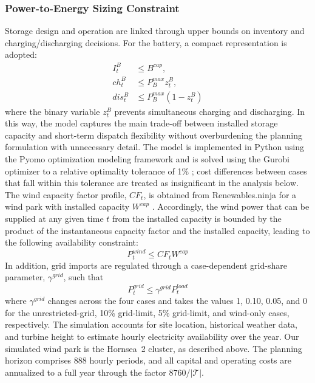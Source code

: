 \documentclass[letterpaper]{article}
\begin{document}
\subsubsection{Power-to-Energy Sizing Constraint}
Storage design and operation are linked through upper bounds on
inventory and charging/discharging decisions. For the battery, a
compact representation is adopted:
\begin{equation}
\begin{aligned}
I^B_t &\le B^{cap},\\
ch^B_t &\le P_B^{max} z^B_t,\\
dis^B_t &\le P_B^{max}(1-z^B_t)
\end{aligned}
\end{equation}
where the binary variable $z^B_t$ prevents simultaneous charging and
discharging. In this way, the model captures the main trade-off
between installed storage capacity and short-term dispatch
flexibility without overburdening the planning formulation with
unnecessary detail. The model is implemented in Python using the
Pyomo optimization modeling framework and is solved using the Gurobi
optimizer to a relative optimality tolerance of 1\%
\cite{Hart2011,gurobi}; cost differences between cases that fall
within this tolerance are treated as insignificant in the analysis
below. The wind capacity factor profile,
$CF_t$, is obtained from Renewables.ninja for a wind park with
installed capacity $W^{cap}$ \cite{renewables_ninja}. Accordingly,
the wind power that can be supplied at any given time $t$ from the
installed capacity is bounded by the product of the instantaneous
capacity factor and the installed capacity, leading to the following
availability constraint:
\begin{equation}
  P^{wind}_t \le CF_t W^{cap}
\end{equation}
In addition, grid imports are regulated through a case-dependent
grid-share parameter, $\gamma^{grid}$, such that
\begin{equation}
  P^{grid}_t \le \gamma^{grid} P^{load}_t
\end{equation}
where $\gamma^{grid}$ changes across the four cases and takes the
values 1, 0.10, 0.05, and 0 for the unrestricted-grid, 10\%
grid-limit, 5\% grid-limit, and wind-only cases, respectively. The
simulation accounts for site location, historical weather data, and
turbine height to estimate hourly electricity availability over the
year. Our simulated wind park is the Hornsea~2 cluster, as described
above. The planning horizon comprises 888 hourly periods, and all
capital and operating costs are annualized to a full year through the
factor $8760/|\mathcal{T}|$.
\end{document}

